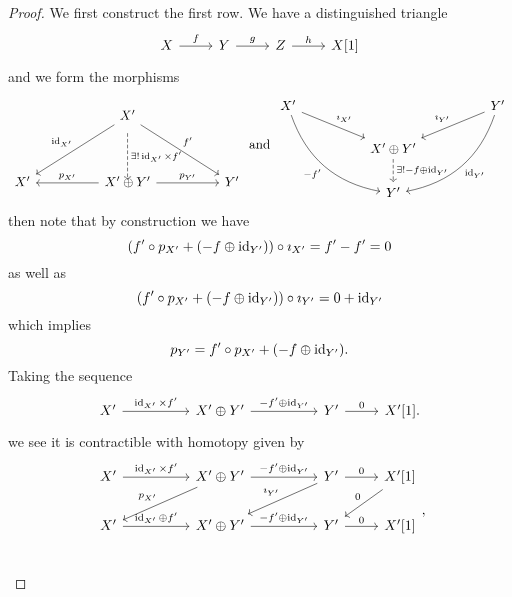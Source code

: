 \documentclass[dissertation.tex]{subfiles}
\begin{document}
\begin{prop}
\begin{proof}
  We first construct the first row.
  We have a distinguished triangle
  $$\begin{tikzcd}
    X \arrow{r}{f} & Y \arrow{r}{g} & Z \arrow{r}{h} & X[1]
  \end{tikzcd}$$
  and we form the morphisms
  $$\begin{tikzcd}
    & & X^\prime \arrow[swap]{lldd}{\id_{X^\prime}}\arrow{rrdd}{f^\prime}\arrow[dashed,yshift=-1.5ex]{dd}{\exists !\id_{X^\prime} \times f^\prime}\\
    \\
    X^\prime & & X^\prime \oplus Y^\prime \arrow[swap]{ll}{p_{X^\prime}}\arrow{rr}{p_{Y^\prime}} & & Y^\prime
  \end{tikzcd}
  \ \text{and}\ 
  \begin{tikzcd}
    X^\prime \arrow{rrd}{\imath_{X^\prime}}\arrow[swap,bend right]{rrdd}{-f^\prime} & & & & Y^\prime \arrow[swap]{lld}{\imath_{Y^\prime}}\arrow[bend left]{lldd}{\id_{Y^\prime}}\\
    & & X^\prime \oplus Y^\prime \arrow[dashed]{d}{\exists ! -f \oplus \id_{Y^\prime}}\\
    & & Y^\prime
  \end{tikzcd}$$
  then note that by construction we have
  $$(f^\prime \circ p_{X^\prime} + (-f \oplus \operatorname{id}_{Y^\prime})) \circ \imath_{X^\prime} = f^\prime - f^\prime = 0$$
  as well as
  $$(f^\prime \circ p_{X^\prime} + (-f \oplus \operatorname{id}_{Y^\prime})) \circ \imath_{Y^\prime} = 0 + \operatorname{id}_{Y^\prime}$$
  which implies 
  $$p_{Y^\prime} = f^\prime \circ p_{X^\prime} + (-f \oplus \operatorname{id}_{Y^\prime}).$$
  Taking the sequence
  $$\begin{tikzcd}
    X^\prime \arrow{rr}{\id_{X^\prime} \times f^\prime} & &
    X^\prime \oplus Y^\prime \arrow{rr}{-f^\prime \oplus \id_{Y^\prime}} & &
    Y^\prime \arrow{r}{0} & 
    X^\prime[1].
  \end{tikzcd}$$
  we see it is contractible with homotopy given by
  $$\begin{tikzcd}
    X^\prime \arrow{rr}{\id_{X^\prime} \times f^\prime} & &
    X^\prime \oplus Y^\prime \arrow{rr}{-f^\prime \oplus \id_{Y^\prime}}\arrow[swap]{lld}{p_{X^\prime}} & &
    Y^\prime \arrow{r}{0}\arrow[swap]{lld}{\imath_{Y^\prime}} &
    X^\prime[1] \arrow[swap]{ld}{0}\\
    X^\prime \arrow{rr}{\id_{X^\prime} \oplus f^\prime} & &
    X^\prime \oplus Y^\prime \arrow{rr}{-f^\prime \oplus \id_{Y^\prime}} & &
    Y^\prime \arrow{r}{0} & 
    X^\prime[1]\\
  \end{tikzcd},$$

\end{proof}
\end{prop}
\end{document}
